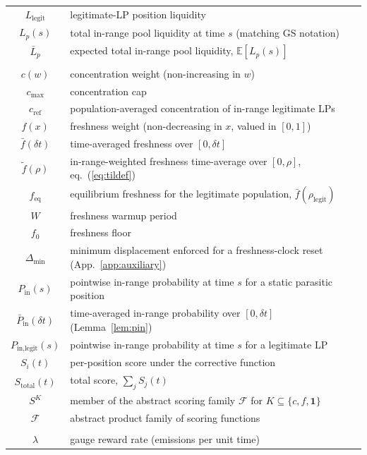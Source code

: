 \documentclass[11pt,a4paper]{article}
\theoremstyle{definition}
\theoremstyle{plain}
\theoremstyle{remark}
\begin{document}
{\begin{longtable}{@{}cL{8.5cm}@{}}
$L_{\text{legit}}$ & legitimate-LP position liquidity \\
$L_p(s)$ & total in-range pool liquidity at time $s$ (matching GS notation) \\
$\bar L_p$ & expected total in-range pool liquidity, $\mathbb{E}[L_p(s)]$ \\
\addlinespace[8pt]
 \\
\addlinespace[3pt]
$c(w)$ & concentration weight (non-increasing in $w$) \\
$c_{\max}$ & concentration cap \\
$c_{\text{ref}}$ & population-averaged concentration of in-range legitimate LPs \\
$f(x)$ & freshness weight (non-decreasing in $x$, valued in $[0,1]$) \\
$\bar f(\delta t)$ & time-averaged freshness over $[0, \delta t]$ \\
$\tilde f(\rho)$ & in-range-weighted freshness time-average over $[0, \rho]$, eq.~(\ref{eq:tildef}) \\
$f_{\text{eq}}$ & equilibrium freshness for the legitimate population, $\bar f(\rho_{\text{legit}})$ \\
$W$ & freshness warmup period \\
$f_0$ & freshness floor \\
$\Delta_{\min}$ & minimum displacement enforced for a freshness-clock reset (App.~\ref{app:auxiliary}) \\
$P_{\text{in}}(s)$ & pointwise in-range probability at time $s$ for a static parasitic position \\
$\bar P_{\text{in}}(\delta t)$ & time-averaged in-range probability over $[0, \delta t]$ (Lemma~\ref{lem:pin}) \\
$P_{\text{in,legit}}(s)$ & pointwise in-range probability at time $s$ for a legitimate LP \\
$S_i(t)$ & per-position score under the corrective function \\
$S_{\text{total}}(t)$ & total score, $\sum_j S_j(t)$ \\
$S^K$ & member of the abstract scoring family $\mathcal{F}$ for $K \subseteq \{c, f, \mathbf{1}\}$ \\
$\mathcal{F}$ & abstract product family of scoring functions \\
\addlinespace[8pt]
 \\
\addlinespace[3pt]
$\lambda$ & gauge reward rate (emissions per unit time) \\

\end{longtable}}
\end{document}
